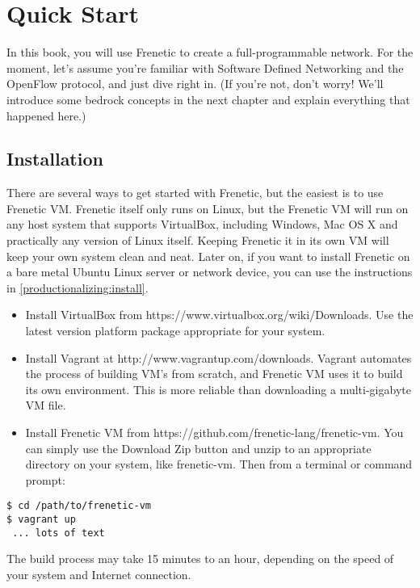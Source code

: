
\chapter{Quick Start}

In this book, you will use Frenetic to create a full-programmable network.  For the moment, let's assume you're familiar with Software Defined Networking and the OpenFlow protocol, and just dive right in.  (If you're not, don't worry!  We'll introduce some bedrock concepts in the next chapter and explain everything that happened here.)  

\section{Installation}

There are several ways to get started with Frenetic, but the easiest is to use Frenetic VM.  Frenetic itself only runs on Linux, but the Frenetic VM will run on any host system that supports VirtualBox, including Windows, Mac OS X and practically any version of Linux itself.   Keeping Frenetic it in its own VM will keep your own system clean and neat.  Later on, if you want to install Frenetic on a bare metal Ubuntu Linux server or network device, you can use the instructions in \ref{productionalizing:install}.  

\begin{itemize}
\item Install VirtualBox from https://www.virtualbox.org/wiki/Downloads.  Use the latest version platform package appropriate for your system.  
\item Install Vagrant at http://www.vagrantup.com/downloads.  Vagrant automates the process of building VM's from scratch, and Frenetic VM uses it to build its own environment.  This is more reliable than downloading a multi-gigabyte VM file.   
\item Install Frenetic VM from https://github.com/frenetic-lang/frenetic-vm.  You can simply use the Download Zip button and unzip to an appropriate directory on your system, like frenetic-vm.  Then from a terminal or command prompt:
\end{itemize}

\begin{verbatim}
$ cd /path/to/frenetic-vm
$ vagrant up
 ... lots of text 
\end{verbatim}

The build process may take 15 minutes to an hour, depending on the speed of your system and Internet connection. 

